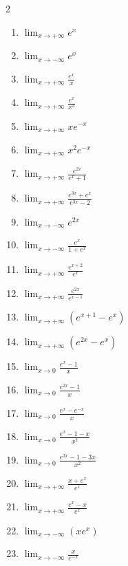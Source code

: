 \documentclass[12pt,a4paper]{article}
\begin{document}
\begin{multicols}{2}
\setlength{\columnseprule}{0.1mm} %
\begin{enumerate}

\item $\displaystyle \lim_{x \to +\infty} e^x$
\item $\displaystyle \lim_{x \to -\infty} e^x$

\item $\displaystyle \lim_{x \to +\infty} \frac{e^x}{x}$
\item $\displaystyle \lim_{x \to +\infty} \frac{e^x}{x^3}$

\item $\displaystyle \lim_{x \to +\infty} x e^{-x}$
\item $\displaystyle \lim_{x \to +\infty} x^2 e^{-x}$

\item $\displaystyle \lim_{x \to +\infty} \frac{e^{2x}}{e^x + 1}$
\item $\displaystyle \lim_{x \to +\infty} \frac{e^{3x} + e^x}{e^{3x} - 2}$

\item $\displaystyle \lim_{x \to -\infty} e^{2x}$
\item $\displaystyle \lim_{x \to -\infty} \frac{e^x}{1 + e^x}$


\item $\displaystyle \lim_{x \to +\infty} \frac{e^{x+2}}{e^x}$
\item $\displaystyle \lim_{x \to +\infty} \frac{e^{2x}}{e^{x-1}}$

\item $\displaystyle \lim_{x \to +\infty} \left(e^{x+1} - e^x\right)$
\item $\displaystyle \lim_{x \to +\infty} \left(e^{2x} - e^x\right)$


\item $\displaystyle \lim_{x \to 0} \frac{e^x - 1}{x}$
\item $\displaystyle \lim_{x \to 0} \frac{e^{2x} - 1}{x}$

\item $\displaystyle \lim_{x \to 0} \frac{e^x - e^{-x}}{x}$
\item $\displaystyle \lim_{x \to 0} \frac{e^x - 1 - x}{x^2}$

\item $\displaystyle \lim_{x \to 0} \frac{e^{3x} - 1 - 3x}{x^2}$


\item $\displaystyle \lim_{x \to +\infty} \frac{x + e^x}{e^x}$
\item $\displaystyle \lim_{x \to +\infty} \frac{e^x - x}{e^x}$

\item $\displaystyle \lim_{x \to -\infty} \left(x e^x\right)$
\item $\displaystyle \lim_{x \to -\infty} \frac{x}{e^{-x}}$

\end{enumerate}

\end{multicols}
\end{document}
